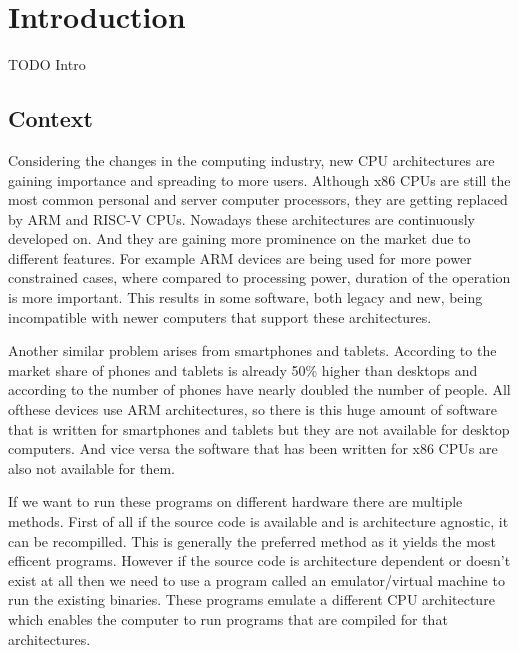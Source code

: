 
\chapter{Introduction}\label{chapter:introduction}
TODO Intro

\section{Context}
Considering the changes in the computing industry, new CPU architectures are gaining importance and spreading to more users.
Although x86 CPUs are still the most common personal and server computer processors, they are getting replaced by ARM and RISC-V CPUs.
Nowadays these architectures are continuously developed on.
And they are gaining more prominence on the market due to different features.
For example ARM devices are being used for more power constrained cases, where compared to processing power, duration of the operation is more important.
This results in some software, both legacy and new, being incompatible with newer computers that support these architectures.

Another similar problem arises from smartphones and tablets.
According to \cite{statscounter} the market share of phones and tablets is already 50\% higher than desktops and according to \cite{radicati} the number of phones have nearly doubled the number of people.
All ofthese devices use ARM architectures, so there is this huge amount of software that is written for smartphones and tablets but they are not available for desktop computers.
And vice versa the software that has been written for x86 CPUs are also not available for them.

If we want to run these programs on different hardware there are multiple methods.
First of all if the source code is available and is architecture agnostic, it can be recompilled.
This is generally the preferred method as it yields the most efficent programs.
However if the source code is architecture dependent or doesn't exist at all then we need to use a program called an emulator/virtual machine to run the existing binaries.
These programs emulate a different CPU architecture which enables the computer to run programs that are compiled for that architectures. 


